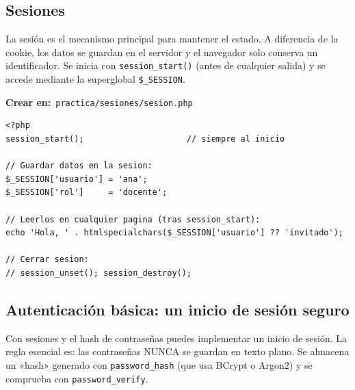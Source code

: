\documentclass[11pt]{article}
\begin{document}
\subsection{Sesiones}
La sesión es el mecanismo principal para mantener el estado. A diferencia de la cookie, los datos se guardan en el servidor y el navegador solo conserva un identificador. Se inicia con \texttt{session\_start()} (antes de cualquier salida) y se accede mediante la superglobal \texttt{\$\_SESSION}.

{\small\color{phpazulo}\textbf{Crear en:}~}\texttt{practica/\allowbreak{}sesiones/\allowbreak{}sesion.\allowbreak{}php}\par\nobreak\vspace{-1pt}
\begin{cajacodigo}[Sesiones]
\begin{lstlisting}[style=php]
<?php
session_start();                     // siempre al inicio

// Guardar datos en la sesion:
$_SESSION['usuario'] = 'ana';
$_SESSION['rol']     = 'docente';

// Leerlos en cualquier pagina (tras session_start):
echo 'Hola, ' . htmlspecialchars($_SESSION['usuario'] ?? 'invitado');

// Cerrar sesion:
// session_unset(); session_destroy();
\end{lstlisting}
\end{cajacodigo}
\vspace{2pt}
\subsection{Autenticación básica: un inicio de sesión seguro}
Con sesiones y el hash de contraseñas puedes implementar un inicio de sesión. La regla esencial es: las contraseñas NUNCA se guardan en texto plano. Se almacena un «hash» generado con \texttt{password\_hash} (que usa BCrypt o Argon2) y se comprueba con \texttt{password\_verify}.
\end{document}
